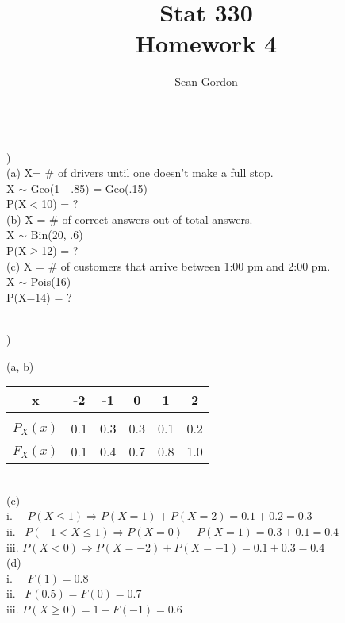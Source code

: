 \documentclass[12pt]{article}
\title{Stat 330\\Homework 4}
\author{Sean Gordon}
\begin{document}
\maketitle


\noindent\hrulefill \\


)\\
\indent (a) X= \# of drivers until one doesn't make a full stop.\\
\indent \indent X $\sim$ Geo(1 - .85) = Geo(.15)\\
\indent \indent P(X$<$10) = ?\\

\indent (b) X = \# of correct answers out of total answers.\\
\indent \indent X $\sim$ Bin(20, .6)\\
\indent \indent P(X$\ge$12) = ?\\

\indent (c) X = \# of customers that arrive between 1:00 pm and 2:00 pm.\\
\indent \indent X $\sim$ Pois(16)\\
\indent \indent P(X=14) = ?\\


\noindent \hrulefill \\
\pagebreak


)

\indent (a, b) 
\begin{tabular}{c|ccccc}
 x & -2 & -1 & 0 & 1 & 2 \\
 \hline &&&&&\\[-1em]
$P_X(x)$ & 0.1 & 0.3 & 0.3 & 0.1 & 0.2\\
$F_X(x)$ & 0.1 & 0.4 & 0.7 & 0.8 & 1.0\\
\end{tabular}\\


\indent (c) \\
\indent \indent i. \ \ $P(X\le 1) \Rightarrow P(X = 1) + P(X = 2) = 0.1+0.2 = 0.3$\\[.4em]
\indent \indent ii. \ $P(-1 < X \le 1) \Rightarrow P(X=0)+P(X=1) = 0.3+0.1 = 0.4$\\[.4em]
\indent \indent iii. $P(X < 0) \Rightarrow P(X=-2)+P(X=-1) = 0.1+0.3 = 0.4$\\

\indent (d) \\
\indent \indent i. \ \ $F(1) = 0.8$\\[.4em]
\indent \indent ii. \ $F(0.5) = F(0) = 0.7$\\[.4em]
\indent \indent iii. $P(X \ge 0) = 1-F(-1) = 0.6$\\
\end{document}
